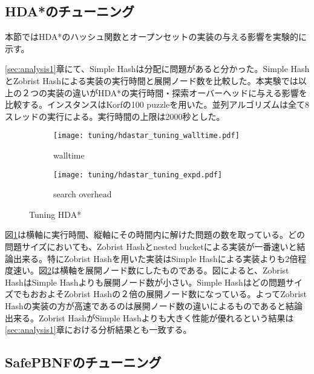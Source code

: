 \documentclass[uplatex]{jsarticle}
\begin{document}
\subsection{HDA*のチューニング}
\label{sec:hdastar_tuning}

本節ではHDA*のハッシュ関数とオープンセットの実装の与える影響を実験的に示す。

\ref{sec:analysis1}章にて、Simple Hashは分配に問題があると分かった。Simple HashとZobrist Hashによる実装の実行時間と展開ノード数を比較した。本実験では以上の２つの実装の違いがHDA*の実行時間・探索オーバーヘッドに与える影響を比較する。インスタンスはKorfの100 puzzleを用いた\cite{Korf1985depth}。並列アルゴリズムは全て8スレッドの実行による。実行時間の上限は2000秒とした。
\newline

\begin{figure}[h]
	\centering
	\begin{subfigure}{0.4\columnwidth}
		\texttt{[image: tuning/hdastar\_tuning\_walltime.pdf]}
		\caption{walltime}
		\label{fig:hdastar_tuning_walltime}
	\end{subfigure}
	\begin{subfigure}{0.4\columnwidth}
		\texttt{[image: tuning/hdastar\_tuning\_expd.pdf]}
		\caption{search overhead}
		\label{fig:hdastar_tuning_expd}
	\end{subfigure}
	\caption{Tuning HDA*}
	\label{fig:hdastar_tuning}
\end{figure}

図\ref{fig:hdastar_tuning_walltime}は横軸に実行時間、縦軸にその時間内に解けた問題の数を取っている。どの問題サイズにおいても、Zobrist Hashとnested bucketによる実装が一番速いと結論出来る。特にZobrist Hashを用いた実装はSimple Hashによる実装よりも2倍程度速い。図\ref{fig:hdastar_tuning_expd}は横軸を展開ノード数にしたものである。図によると、Zobrist HashはSimple Hashよりも展開ノード数が小さい。Simple Hashはどの問題サイズでもおおよそZobrist Hashの２倍の展開ノード数になっている。よってZobrist Hashの実装の方が高速であるのは展開ノード数の違いによるものであると結論出来る。Zobrist HashがSimple Hashよりも大きく性能が優れるという結果は\ref{sec:analysis1}章における分析結果とも一致する。


\subsection{SafePBNFのチューニング}
\label{sec:pbnf_tuning}
\end{document}
